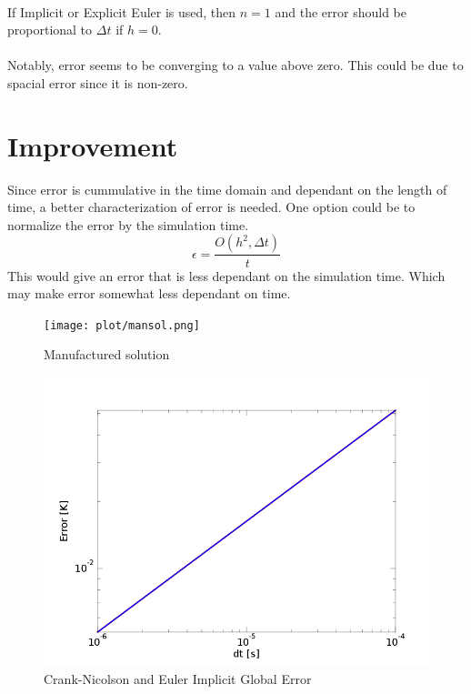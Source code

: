 \documentclass[12pt,twocolumn]{article}
\begin{document}
\paragraph{} If Implicit or Explicit Euler is used, then $n=1$ and the error should be proportional to $\Delta t$ if $h=0$.
\paragraph{} Notably, error seems to be converging to a value above zero. This could be due to spacial error since it is non-zero.

\section*{Improvement}
Since error is cummulative in the time domain and dependant on the length of time, a better characterization of error is needed.
One option could be to normalize the error by the simulation time.
\begin{equation}\epsilon = \frac{O(h^2,\Delta t)}{t}\end{equation}
This would give an error that is less dependant on the simulation time. Which may make error somewhat less dependant on time.
\begin{figure}
\texttt{[image: plot/mansol.png]}
\footnotesize{\caption{Manufactured solution}}
\end{figure}

\begin{figure}
\includegraphics[width=\columnwidth]{plot/error.png}
\footnotesize{\caption{Crank-Nicolson and Euler Implicit Global Error}}
\end{figure}
\end{document}
